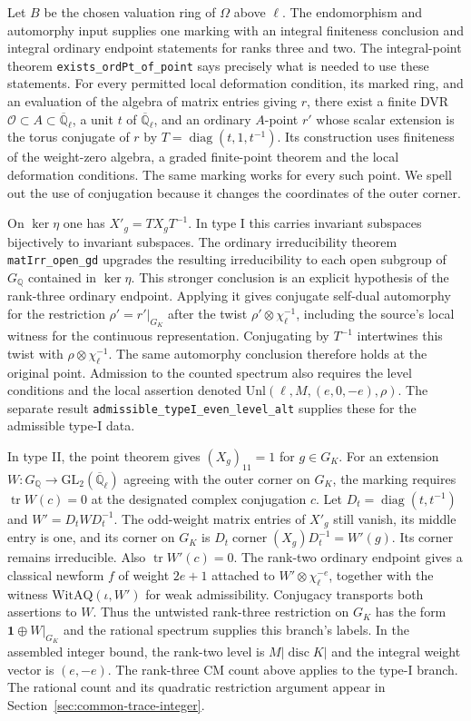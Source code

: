 Let $B$ be the chosen valuation ring of $\Omega$ above $\ell$.
The endomorphism and automorphy input  supplies one
marking with an integral finiteness conclusion and integral ordinary
endpoint statements for ranks three and two. The integral-point
theorem \texttt{exists\_ordPt\_of\_point} says precisely what is
needed to use these statements. For every permitted local deformation
condition, its marked ring, and an evaluation of the algebra of
matrix entries giving $r$, there exist a finite DVR
$\mathcal O\subset A\subset\overline{\mathbb Q}_\ell$, a unit $t$
of $\overline{\mathbb Q}_\ell$, and an ordinary $A$-point $r'$
whose scalar extension is the torus conjugate of $r$ by
$T=\operatorname{diag}(t,1,t^{-1})$. Its construction uses finiteness
of the weight-zero algebra, a graded finite-point theorem and the
local deformation conditions. The same marking works for every such
point. We spell out the use of conjugation because it changes the
coordinates of the outer corner.

On $\ker\eta$ one has $X'_g=TX_gT^{-1}$. In type I this carries
invariant subspaces bijectively to invariant subspaces. The ordinary
irreducibility theorem \texttt{matIrr\_open\_gd} upgrades the resulting
irreducibility to each open subgroup of $G_{\mathbb Q}$ contained in
$\ker\eta$. This stronger conclusion is an explicit hypothesis of
the rank-three ordinary endpoint. Applying it gives conjugate
self-dual automorphy for the restriction $\rho'=r'|_{G_K}$ after
the twist $\rho'\otimes\chi_\ell^{-1}$, including the source's
local witness for the continuous representation. Conjugating by
$T^{-1}$ intertwines this twist with
$\rho\otimes\chi_\ell^{-1}$. The same automorphy conclusion therefore
holds at the original point. Admission to the counted spectrum also
requires the level conditions and the local assertion denoted
$\mathrm{Unl}(\ell,M,(e,0,-e),\rho)$. The separate result
\texttt{admissible\_typeI\_even\_level\_alt} supplies these for the
admissible type-I data.

In type II, the point theorem gives $(X_g)_{11}=1$ for $g\in G_K$.
For an extension $W:G_{\mathbb Q}\to\mathrm{GL}_2(
\overline{\mathbb Q}_\ell)$ agreeing with the outer corner on $G_K$,
the marking requires $\operatorname{tr}W(c)=0$ at the designated
complex conjugation $c$. Let $D_t=\operatorname{diag}(t,t^{-1})$
and $W'=D_t W D_t^{-1}$. The odd-weight matrix entries of $X'_g$
still vanish, its middle entry is one, and its corner on $G_K$ is
$D_t\operatorname{corner}(X_g)D_t^{-1}=W'(g)$. Its corner remains
irreducible. Also $\operatorname{tr}W'(c)=0$. The rank-two ordinary
endpoint gives a classical newform $f$ of weight $2e+1$ attached to
$W'\otimes\chi_\ell^{-e}$, together with the witness
$\mathrm{WitAQ}(\iota,W')$ for weak admissibility. Conjugacy
transports both assertions to $W$. Thus the untwisted rank-three
restriction on $G_K$ has the form $\mathbf1\oplus W|_{G_K}$ and
the rational spectrum supplies this branch's labels. In the assembled
integer bound, the rank-two level is $M|\operatorname{disc}K|$ and
the integral weight vector is $(e,-e)$. The rank-three
CM count above applies to the type-I branch. The rational count
and its quadratic restriction argument appear in
Section~\ref{sec:common-trace-integer}.

